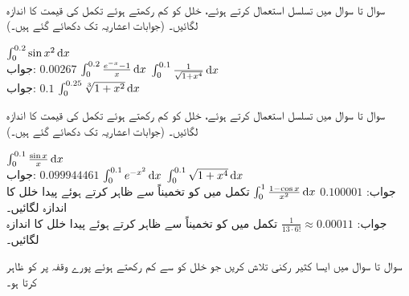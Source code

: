 \\
سوال  تا سوال  میں تسلسل استعمال کرتے ہوئے، خلل کو  کم رکھتے ہوئے تکمل کی قیمت کا اندازہ لگائیں۔ (جوابات  اعشاریہ تک دکھائے گئے ہیں۔)

$\int_{0}^{0.2}\sin x^2\dif x$\\
جواب:\quad
$\num{0.00267}$
$\int_0^{0.2}\frac{e^{-x}-1}{x}\dif x$
$\int_0^{0.1}\frac{1}{\sqrt{1+x^4}}\dif x$\\
جواب:\quad
$\num{0.1}$
$\int_0^{0.25}\sqrt[3]{1+x^2}\dif x$

سوال  تا سوال  میں تسلسل استعمال کرتے ہوئے، خلل کو  کم رکھتے ہوئے تکمل کی قیمت کا اندازہ لگائیں۔ (جوابات  اعشاریہ تک دکھائے گئے ہیں۔)

$\int_0^{0.1}\frac{\sin x}{x}\dif x$\\
جواب:\quad
$\num{0.099944461}$
$\int_0^{0.1}e^{-x^2}\dif x$
$\int_0^{0.1}\sqrt{1+x^4}\dif x$\\
جواب:\quad
$\num{0.100001}$
$\int_0^1\frac{1-\cos x}{x^2}\dif x$
تکمل  میں  کو تخمیناً  سے ظاہر کرتے ہوئے پیدا خلل کا اندازہ لگائیں۔\\
جواب:\quad
$\tfrac{1}{13\cdot 6!}\approx \num{0.00011}$
تکمل  میں  کو تخمیناً   سے ظاہر  کرتے ہوئے پیدا خلل کا اندازہ لگائیں۔

سوال  تا سوال  میں ایسا کثیر رکنی تلاش کریں جو خلل کو  سے کم رکھتے ہوئے پورے وقفہ پر  کو ظاہر کرتا ہو۔

